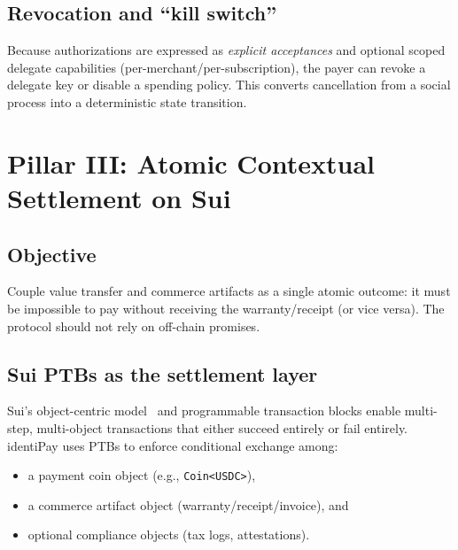 \documentclass[11pt]{article}
\begin{document}
\subsection{Revocation and ``kill switch''}
Because authorizations are expressed as \emph{explicit acceptances} and optional scoped delegate capabilities (per-merchant/per-subscription), the payer can revoke a delegate key or disable a spending policy. This converts cancellation from a social process into a deterministic state transition.

\section{Pillar III: Atomic Contextual Settlement on Sui}
\subsection{Objective}
Couple value transfer and commerce artifacts as a single atomic outcome: it must be impossible to pay without receiving the warranty/receipt (or vice versa). The protocol should not rely on off-chain promises.

\subsection{Sui PTBs as the settlement layer}
Sui's object-centric model~\cite{sui} and programmable transaction blocks enable multi-step, multi-object transactions that either succeed entirely or fail entirely. identiPay uses PTBs to enforce conditional exchange among:
\begin{itemize}
  \item a payment coin object (e.g., \texttt{Coin<USDC>}),
  \item a commerce artifact object (warranty/receipt/invoice), and
  \item optional compliance objects (tax logs, attestations).
\end{itemize}
\end{document}
